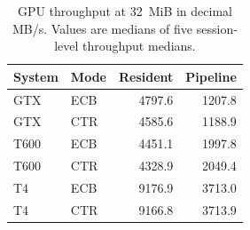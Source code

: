 \begin{table}[htbp]
  \centering
  \small
  \caption{GPU throughput at 32~MiB in decimal MB/s. Values are medians of
  five session-level throughput medians.}
  \label{tab:gpu-throughput}
  \begin{tabular}{llrr}
    \toprule
    System & Mode & Resident & Pipeline \\
    \midrule
    GTX & ECB & 4797.6 & 1207.8 \\
    GTX & CTR & 4585.6 & 1188.9 \\
    T600 & ECB & 4451.1 & 1997.8 \\
    T600 & CTR & 4328.9 & 2049.4 \\
    T4 & ECB & 9176.9 & 3713.0 \\
    T4 & CTR & 9166.8 & 3713.9 \\
    \bottomrule
  \end{tabular}
\end{table}
